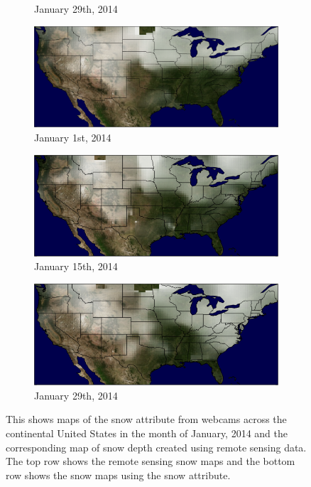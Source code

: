 \documentclass[10pt,twocolumn,letterpaper]{article}
\begin{document}
\begin{figure}
\begin{subfigure}[b]{0.33\textwidth}
    \caption{January 29th, 2014}
    \label{fig:snow_map_3}
  \end{subfigure}
  \begin{subfigure}[b]{0.33\textwidth}
    \centering
		\includegraphics[width=\textwidth, trim= 0mm 0mm 0mm 0mm]{figs/snow_map_1.png}
    \caption{January 1st, 2014}
    \label{fig:snow_map_1}
  \end{subfigure}
  \begin{subfigure}[b]{0.33\textwidth}
    \centering
		\includegraphics[width=\textwidth, trim= 0mm 0mm 0mm 0mm]{figs/snow_map_2.png}
    \caption{January 15th, 2014}
    \label{fig:snow_map_2}
  \end{subfigure}
  \begin{subfigure}[b]{0.33\textwidth}
    \centering
		\includegraphics[width=\textwidth, trim= 0mm 0mm 0mm 0mm]{figs/snow_map_3.png}
    \caption{January 29th, 2014}
    \label{fig:snow_map_3}
  \end{subfigure}
  \caption{This shows maps of the snow attribute from webcams across the
           continental United States in the month of January, 2014 and the corresponding
           map of snow depth created using remote sensing data.\protect\footnotemark 
           The top row shows the remote sensing snow maps and the bottom row 
           shows the snow maps using the snow attribute.}
  \label{fig:snow_maps}
\end{figure}
\end{document}
